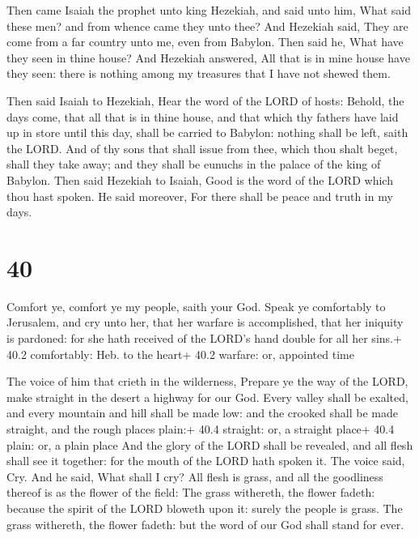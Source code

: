  Then came Isaiah the prophet unto king Hezekiah, and said
unto him, What said these men? and from whence came they unto thee? And
Hezekiah said, They are come from a far country unto me, even from
Babylon.  Then said he, What have they seen in thine house?
And Hezekiah answered, All that is in mine house have they seen: there
is nothing among my treasures that I have not shewed them.

 Then said Isaiah to Hezekiah, Hear the word of the LORD of
hosts:  Behold, the days come, that all that is in thine
house, and that which thy fathers have laid up in store until this day,
shall be carried to Babylon: nothing shall be left, saith the LORD.
 And of thy sons that shall issue from thee, which thou
shalt beget, shall they take away; and they shall be eunuchs in the
palace of the king of Babylon.  Then said Hezekiah to
Isaiah, Good is the word of the LORD which thou hast spoken. He said
moreover, For there shall be peace and truth in my days.

\hypertarget{section-39}{%
\section{40}\label{section-39}}

 Comfort ye, comfort ye my people, saith your God.
 Speak ye comfortably to Jerusalem, and cry unto her, that
her warfare is accomplished, that her iniquity is pardoned: for she hath
received of the LORD's hand double for all her sins.+ 40.2 comfortably:
Heb. to the heart+ 40.2 warfare: or, appointed time

 The voice of him that crieth in the wilderness, Prepare
ye the way of the LORD, make straight in the desert a highway for our
God.  Every valley shall be exalted, and every mountain and
hill shall be made low: and the crooked shall be made straight, and the
rough places plain:+ 40.4 straight: or, a straight place+ 40.4 plain:
or, a plain place  And the glory of the LORD shall be
revealed, and all flesh shall see it together: for the mouth of the LORD
hath spoken it.  The voice said, Cry. And he said, What
shall I cry? All flesh is grass, and all the goodliness thereof is as
the flower of the field:  The grass withereth, the flower
fadeth: because the spirit of the LORD bloweth upon it: surely the
people is grass.  The grass withereth, the flower fadeth:
but the word of our God shall stand for ever.

